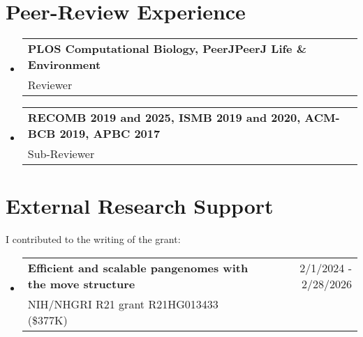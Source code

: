 \documentclass[A4,11pt]{article}
\makeatletter
\newcommand{\CVSubheading}[4]{
  \vspace{-2pt}\item
    \begin{tabular*}{0.97\textwidth}[t]{l@{\extracolsep{\fill}}r}
      \textbf{#1} & #2 \\
      \small#3 & \small #4 \\
    \end{tabular*}\vspace{-7pt}
}
\newcommand{\CVSubHeadingListStart}{\begin{itemize}[leftmargin=0.5cm, label={}]}
\newcommand{\CVSubHeadingListEnd}{\end{itemize}}
\makeatother
\begin{document}

\section{Peer-Review Experience}
\CVSubHeadingListStart
\CVSubheading {PLOS Computational Biology, PeerJPeerJ Life \& Environment}{}{Reviewer}{}
\CVSubheading {RECOMB 2019 and 2025, ISMB 2019 and 2020, ACM-BCB 2019, APBC 2017}{}{Sub-Reviewer}{}
\CVSubHeadingListEnd

\section{External Research Support}
  I contributed to the writing of the grant:\\
  \CVSubHeadingListStart
  \CVSubheading
  {Efficient and scalable pangenomes with the move structure} {2/1/2024 - 2/28/2026}
  {NIH/NHGRI R21 grant R21HG013433 (\$377K)}{}
  \CVSubHeadingListEnd

\begin{comment}
    Section is here as it applied to my application for positions in academia. 
    Remember to tailor the resume for to the position.
\end{comment}
\end{document}
